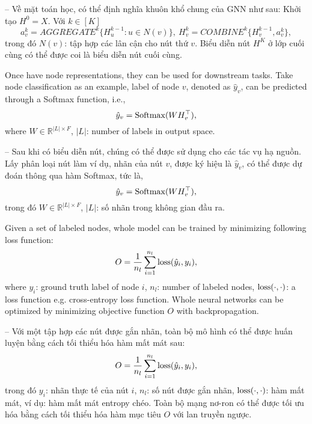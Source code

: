 \documentclass{article}
\begin{document}
\begin{itemize}
\begin{itemize}
\begin{itemize}
            -- Về mặt toán học, có thể định nghĩa khuôn khổ chung của GNN như sau: Khởi tạo $H^0 = X$. Với $k\in[K]$
            \begin{equation*}
                a_v^k = AGGREGATE^k\{H_u^{k-1}:u\in N(v)\},\ H_v^k = COMBINE^k\{H_v^{k-1},a_v^k\},
            \end{equation*}
            trong đó $N(v)$: tập hợp các lân cận cho nút thứ $v$. Biểu diễn nút $H^K$ ở lớp cuối cùng có thể được coi là biểu diễn nút cuối cùng.

            Once have node representations, they can be used for downstream tasks. Take node classification as an example, label of node $v$, denoted as $\hat{y}_v$, can be predicted through a Softmax function, i.e.,
            \begin{equation*}
                \hat{y}_v = {\rm Softmax}(WH_v^\top),
            \end{equation*}
            where $W\in\mathbb{R}^{|L|\times F}$, $|L|$: number of labels in output space.

            -- Sau khi có biểu diễn nút, chúng có thể được sử dụng cho các tác vụ hạ nguồn. Lấy phân loại nút làm ví dụ, nhãn của nút $v$, được ký hiệu là $\hat{y}_v$, có thể được dự đoán thông qua hàm Softmax, tức là,
            \begin{equation*}
                \hat{y}_v = {\rm Softmax}(WH_v^\top),
            \end{equation*}
            trong đó $W\in\mathbb{R}^{|L|\times F}$, $|L|$: số nhãn trong không gian đầu ra.

            Given a set of labeled nodes, whole model can be trained by minimizing following loss function:
            \begin{equation*}
                O = \frac{1}{n_l}\sum_{i=1}^{n_l} {\rm loss}(\hat{y}_i,y_i),
            \end{equation*}
            where $y_i$: ground truth label of node $i$, $n_l$: number of labeled nodes, ${\rm loss}(\cdot,\cdot)$: a loss function e.g. cross-entropy loss function. Whole neural networks can be optimized by minimizing objective function $O$ with backpropagation.

            -- Với một tập hợp các nút được gắn nhãn, toàn bộ mô hình có thể được huấn luyện bằng cách tối thiểu hóa hàm mất mát sau:
            \begin{equation*}
                O = \frac{1}{n_l}\sum_{i=1}^{n_l} {\rm loss}(\hat{y}_i,y_i),
            \end{equation*}
            trong đó $y_i$: nhãn thực tế của nút $i$, $n_l$: số nút được gắn nhãn, ${\rm loss}(\cdot,\cdot)$: hàm mất mát, ví dụ: hàm mất mát entropy chéo. Toàn bộ mạng nơ-ron có thể được tối ưu hóa bằng cách tối thiểu hóa hàm mục tiêu $O$ với lan truyền ngược.


\end{itemize}
\end{itemize}
\end{itemize}
\end{document}
